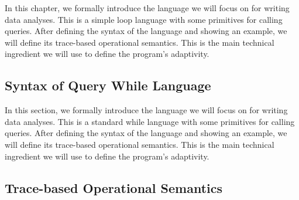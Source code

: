In this chapter, we formally introduce the language we will focus on for writing data analyses.  
This is a simple loop language with some primitives for calling queries. 
After defining the syntax of the language and showing an example, we will define its trace-based operational semantics. 
This is the main technical ingredient we will use to define the program's adaptivity.

\subsection{Syntax of Query While Language}
\label{sec:language-syntax}
In this section, we formally introduce the language we will focus on for writing data analyses.  This is a standard while language with some primitives for calling queries. After defining the syntax of the language and showing an example, we will define its trace-based operational semantics. This is the main technical ingredient we will use to define the program's adaptivity.



\subsection{Trace-based Operational Semantics}
\label{sec:language-os}
